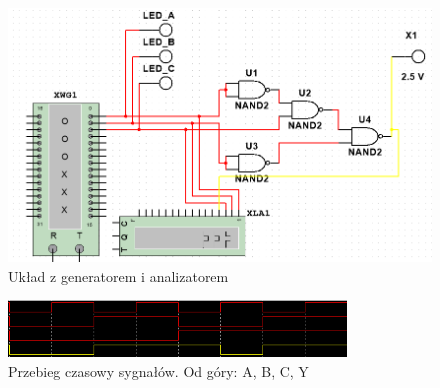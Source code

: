 \documentclass[12pt,a4paper,openright]{mwrep}
\begin{document}
\begin{figure}[H]
    \centering
    \includegraphics[width=1\textwidth]{images/1a_circuit_word_generator.png}
    \caption{Układ z generatorem i analizatorem}
    \label{rys:1a_circuit_with_generators}
\end{figure}

\begin{figure}[H]
    \centering
    \includegraphics[width=0.8\textwidth]{images/1a_timeseries.png}
    \caption{Przebieg czasowy sygnałów. Od góry: A, B, C, Y}
    \label{rys:1a_timeseries}
\end{figure}

\newpage
\end{document}
